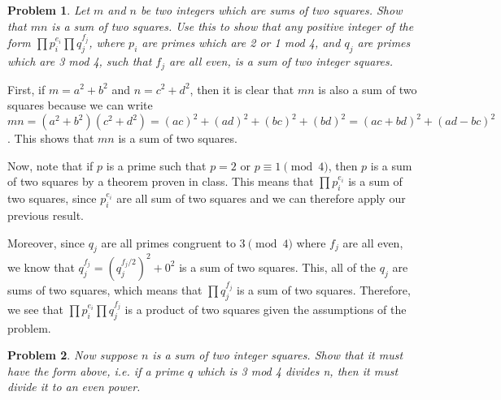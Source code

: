 \documentclass[psamsfonts]{amsart}
\newtheorem{prob}{Problem}[section]
\newenvironment{sol}{{\bfseries Solution}}{\qedsymbol}
\theoremstyle{definition}
\theoremstyle{remark}
\numberwithin{equation}{section}
\begin{document}
\begin{prob}
Let $m$ and $n$ be two integers which are sums of two squares. Show that $mn$ is a sum of two squares. Use this to show that any positive integer of the form $\prod p_i^{e_i} \prod q_j^{f_j}$, where $p_i$ are primes which are 2 or 1 mod 4, and $q_j$ are primes which are 3 mod 4, such that $f_j$ are all even, is a sum of two integer squares. 
\end{prob}

\begin{sol}
First, if $m = a^2 + b^2$ and $n = c^2 + d^2$, then it is clear that $mn$ is also a sum of two squares because we can write $mn = (a^2 + b^2)(c^2 + d^2) = (ac)^2 + (ad)^2 + (bc)^2 + (bd)^2 = (ac + bd)^2 + (ad - bc)^2$. This shows that $mn$ is a sum of two squares. 

Now, note that if $p$ is a prime such that $p =2$ or $p \equiv 1 \pmod{4}$, then $p$ is a sum of two squares by a theorem proven in class. This means that $\prod p_i^{e_i}$ is a sum of two squares, since $p_i^{e_i}$ are all sum of two squares and we can therefore apply our previous result. 

Moreover, since $q_j$ are all primes congruent to $3 \pmod{4}$ where $f_j$ are all even, we know that $q_j^{f_j} = (q_j^{f_j/2})^2 + 0^2$ is a sum of two squares. This, all of the $q_j$ are sums of two squares, which means that $\prod q_j^{f_j}$ is a sum of two squares. Therefore, we see that $\prod p_i^{e_i} \prod q_j^{f_j}$ is a product of two squares given the assumptions of the problem. 
\end{sol}

\begin{prob}
Now suppose $n$ is a sum of two integer squares. Show that it must have the form above, i.e. if a prime $q$ which is 3 mod 4 divides n, then it must divide it to an even power. 
\end{prob}
\end{document}
